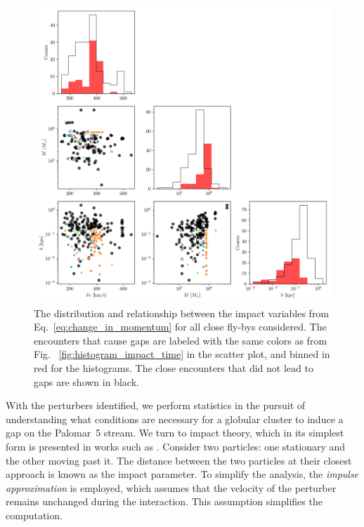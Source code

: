 \documentclass[draft]{aa}
\begin{document}
    \begin{figure}
      \centering
      \includegraphics[width=\linewidth]{impact_geometry_statistics.png}
      \caption{The distribution and relationship between the impact variables from Eq.~\ref{eq:change_in_momentum} for all close fly-bys considered. The encounters that cause gaps are labeled with the same colors as from Fig.~
      \ref{fig:histogram_impact_time} in the scatter plot, and binned in red for the histograms. The close encounters that did not lead to gaps are shown in black. }
      \label{fig:impact_geometry_statistics}    
    \end{figure}



    With the perturbers identified, we perform statistics in the pursuit of understanding what conditions are necessary for a globular cluster to induce a gap on the Palomar~5 stream. We turn to impact theory, which in its simplest form is presented in works such as \citet{2008gady.book.....B}. Consider two particles: one stationary and the other moving past it. The distance between the two particles at their closest approach is known as the impact parameter. To simplify the analysis, the \textit{impulse approximation} is employed, which assumes that the velocity of the perturber remains unchanged during the interaction. This assumption simplifies the computation.
\end{document}
